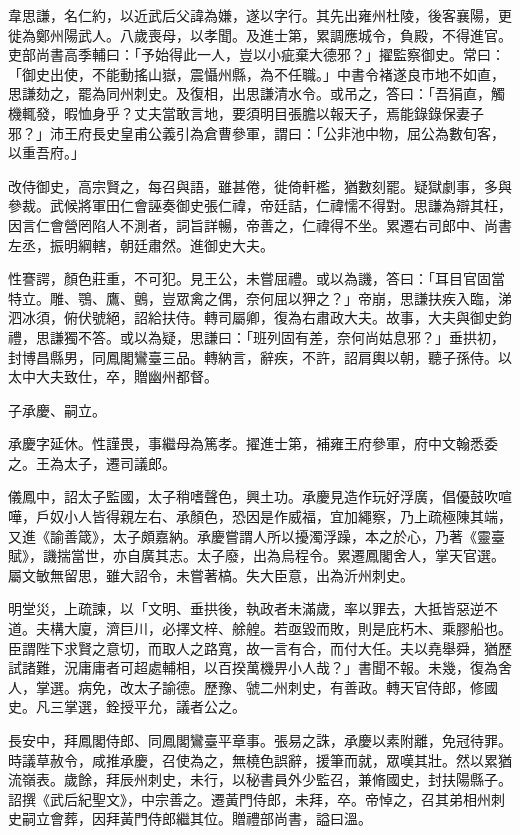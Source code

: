 \begin{pinyinscope}
 韋思謙，名仁約，以近武后父諱為嫌，遂以字行。其先出雍州杜陵，後客襄陽，更徙為鄭州陽武人。八歲喪母，以孝聞。及進士第，累調應城令，負殿，不得進官。吏部尚書高季輔曰：「予始得此一人，豈以小疵棄大德邪？」擢監察御史。常曰：「御史出使，不能動搖山嶽，震懾州縣，為不任職。」中書令褚遂良市地不如直，思謙劾之，罷為同州刺史。及復相，出思謙清水令。或吊之，答曰：「吾狷直，觸機輒發，暇恤身乎？丈夫當敢言地，要須明目張膽以報天子，焉能錄錄保妻子邪？」沛王府長史皇甫公義引為倉曹參軍，謂曰：「公非池中物，屈公為數旬客，以重吾府。」



 改侍御史，高宗賢之，每召與語，雖甚倦，徙倚軒檻，猶數刻罷。疑獄劇事，多與參裁。武候將軍田仁會誣奏御史張仁禕，帝廷詰，仁禕懦不得對。思謙為辯其枉，因言仁會營罔陷人不測者，詞旨詳暢，帝善之，仁禕得不坐。累遷右司郎中、尚書左丞，振明綱轄，朝廷肅然。進御史大夫。



 性謇諤，顏色莊重，不可犯。見王公，未嘗屈禮。或以為譏，答曰：「耳目官固當特立。雕、鶚、鷹、鸇，豈眾禽之偶，奈何屈以狎之？」帝崩，思謙扶疾入臨，涕泗冰須，俯伏號絕，詔給扶侍。轉司屬卿，復為右肅政大夫。故事，大夫與御史鈞禮，思謙獨不答。或以為疑，思謙曰：「班列固有差，奈何尚姑息邪？」垂拱初，封博昌縣男，同鳳閣鸞臺三品。轉納言，辭疾，不許，詔肩輿以朝，聽子孫侍。以太中大夫致仕，卒，贈幽州都督。



 子承慶、嗣立。



 承慶字延休。性謹畏，事繼母為篤孝。擢進士第，補雍王府參軍，府中文翰悉委之。王為太子，遷司議郎。



 儀鳳中，詔太子監國，太子稍嗜聲色，興土功。承慶見造作玩好浮廣，倡優鼓吹喧嘩，戶奴小人皆得親左右、承顏色，恐因是作威福，宜加繩察，乃上疏極陳其端，又進《諭善箴》，太子頗嘉納。承慶嘗謂人所以擾濁浮躁，本之於心，乃著《靈臺賦》，譏揣當世，亦自廣其志。太子廢，出為烏程令。累遷鳳閣舍人，掌天官選。屬文敏無留思，雖大詔令，未嘗著槁。失大臣意，出為沂州刺史。



 明堂災，上疏諫，以「文明、垂拱後，執政者未滿歲，率以罪去，大抵皆惡逆不道。夫構大廈，濟巨川，必擇文梓、艅艎。若亟毀而敗，則是庇朽木、乘膠船也。臣謂陛下求賢之意切，而取人之路寬，故一言有合，而付大任。夫以堯舉舜，猶歷試諸難，況庸庸者可超處輔相，以百揆萬機畀小人哉？」書聞不報。未幾，復為舍人，掌選。病免，改太子諭德。歷豫、虢二州刺史，有善政。轉天官侍郎，修國史。凡三掌選，銓授平允，議者公之。



 長安中，拜鳳閣侍郎、同鳳閣鸞臺平章事。張易之誅，承慶以素附離，免冠待罪。時議草赦令，咸推承慶，召使為之，無橈色誤辭，援筆而就，眾嘆其壯。然以累猶流嶺表。歲餘，拜辰州刺史，未行，以秘書員外少監召，兼脩國史，封扶陽縣子。詔撰《武后紀聖文》，中宗善之。遷黃門侍郎，未拜，卒。帝悼之，召其弟相州刺史嗣立會葬，因拜黃門侍郎繼其位。贈禮部尚書，謚曰溫。




\end{pinyinscope}
